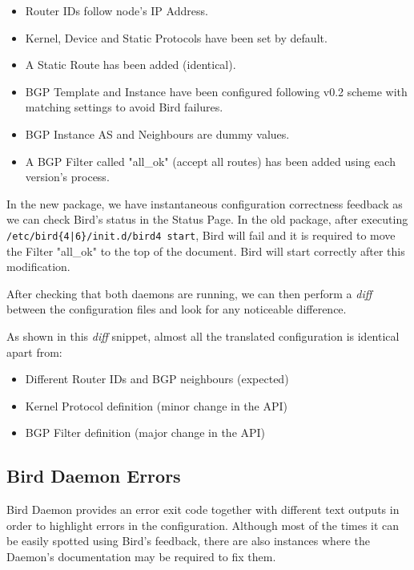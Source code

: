 \begin{itemize}
    \item Router IDs follow node's IP Address.
    \item Kernel, Device and Static Protocols have been set by default.
    \item A Static Route has been added  (identical).
    \item BGP Template and Instance have been configured following v0.2 scheme with matching settings to avoid Bird failures.
    \item BGP Instance AS and Neighbours are dummy values.
    \item A BGP Filter called "all\_ok" (accept all routes) has been added using each version's process.
\end{itemize}

In the new package, we have instantaneous configuration correctness feedback as we can check Bird's status in the Status Page. 
In the old package, after executing \texttt{/etc/bird\{4|6\}/init.d/bird4 start}, Bird will fail and it is required to move the Filter "all\_ok" to the top of the document. Bird will start correctly after this modification.

After checking that both daemons are running, we can then perform a \textit{diff} between the configuration files and look for any noticeable difference.



As shown in this \textit{diff} snippet, almost all the translated configuration is identical apart from:

\begin{itemize}
\item Different Router IDs and BGP neighbours (expected)
\item Kernel Protocol definition (minor change in the API)
\item BGP Filter definition (major change in the API)
\end{itemize}

\subsection{Bird Daemon Errors}
Bird Daemon provides an error exit code together with different text outputs in order to highlight errors in the configuration. Although most of the times it can be easily spotted using Bird's feedback, there are also instances where the Daemon's documentation may be required to fix them.


